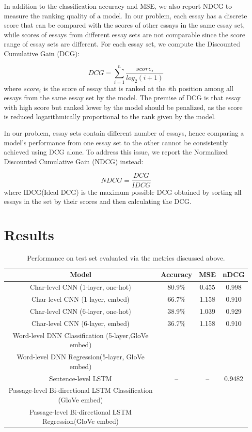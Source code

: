 \documentclass[10pt,psamsfonts]{amsart}
\theoremstyle{definition}
\theoremstyle{remark}
\numberwithin{equation}{section}
\begin{document}
In addition to the classification accuracy and MSE, we also report NDCG to measure the ranking quality of a model. In our problem, each essay has a discrete score that can be compared with the scores of other essays in the same essay set, while scores of essays from different essay sets are not comparable since the score range of essay sets are different. For each essay set, we compute the Discounted Cumulative Gain (DCG):
 
$$DCG=\sum_{i=1}^n\frac{score_i}{log_2(i+1)}$$
where $score_i$ is the score of essay that is ranked at the \textit{i}th position among all essays from the same essay set by the model. The premise of DCG is that essay with high score but ranked lower by the model should be penalized, as the score is reduced logarithmically proportional to the rank given by the model.

In our problem, essay sets contain different number of essays, hence comparing a model's performance from one essay set to the other cannot be consistently achieved using DCG alone. To address this issue, we report the Normalized Discounted Cumulative Gain (NDCG) instead:

$$NDCG=\frac{DCG}{IDCG}$$
where IDCG(Ideal DCG) is the maximum possible DCG obtained by sorting all essays in the set by their scores and then calculating the DCG.

\section*{Results}


\begin{table}
	\begin{tabular}{c|c|c|c}
		Model & Accuracy & MSE & nDCG  \\\hline
		Char-level CNN (1-layer, one-hot) & 80.9\% & 0.455 & 0.998 \\
		Char-level CNN (1-layer, embed) & 66.7\% & 1.158& 0.910\\
		Char-level CNN (6-layer, one-hot) & 38.9\% & 1.039 & 0.929 \\
		Char-level CNN (6-layer, embed) & 36.7\%& 1.158 & 0.910 \\
		Word-level DNN Classification (5-layer,GloVe embed) & & &  \\
		Word-level DNN Regression(5-layer, GloVe embed) & & &  \\
		Sentence-level LSTM & -- & -- & 0.9482 \\
		Passage-level Bi-directional LSTM Classification (GloVe embed) & & &  \\
		Passage-level Bi-directional LSTM Regression(GloVe embed) & & & 
		
	\end{tabular}
	\caption{Performance on test set evaluated via the metrics discussed above.}
	\label{fig:eval}
\end{table}
\end{document}
